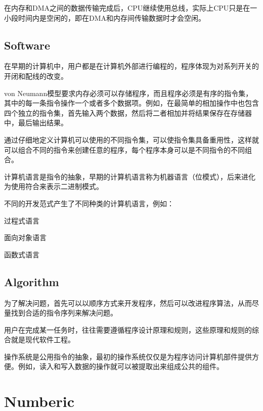 在内存和DMA之间的数据传输完成后，CPU继续使用总线，实际上CPU只是在一小段时间内是空闲的，即在DMA和内存间传输数据时才会空闲。




\section{Software}

在早期的计算机中，用户都是在计算机外部进行编程的，程序体现为对系列开关的开闭和配线的改变。

von Neumann模型要求内存必须可以存储程序，而且程序必须是有序的指令集，其中的每一条指令操作一个或者多个数据项。例如，在最简单的相加操作中也包含四个独立的指令集，首先输入两个数据，然后将二者相加并将结果保存在存储器中，最后输出结果。

通过仔细地定义计算机可以使用的不同指令集，可以使指令集具备重用性，这样就可以组合不同的指令来创建任意的程序，每个程序本身可以是不同指令的不同组合。


计算机语言是指令的抽象，早期的计算机语言称为机器语言（位模式），后来进化为使用符合来表示二进制模式。



不同的开发范式产生了不同种类的计算机语言，例如：

\begin{compactitem}
\item 过程式语言
\item 面向对象语言
\item 函数式语言
\end{compactitem}





\section{Algorithm}


为了解决问题，首先可以以顺序方式来开发程序，然后可以改进程序算法，从而尽量找到合适的指令序列来解决问题。

用户在完成某一任务时，往往需要遵循程序设计原理和规则，这些原理和规则的综合就是现代软件工程。

操作系统是公用指令的抽象，最初的操作系统仅仅是为程序访问计算机部件提供方便。例如，读入和写入数据的操作就可以被提取出来组成公共的组件。


\chapter{Numberic}


